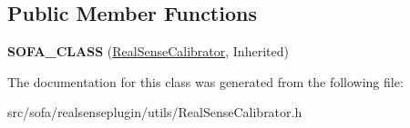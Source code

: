 \subsection*{Public Member Functions}
\begin{DoxyCompactItemize}
\item 
\mbox{\label{classsofa_1_1rgbdtracking_1_1_real_sense_calibrator_a65aec8ab1fa6f8bda1ed0b496d818522}} 
{\bfseries S\+O\+F\+A\+\_\+\+C\+L\+A\+SS} (\hyperlink{classsofa_1_1rgbdtracking_1_1_real_sense_calibrator}{Real\+Sense\+Calibrator}, Inherited)
\end{DoxyCompactItemize}


The documentation for this class was generated from the following file\+:\begin{DoxyCompactItemize}
\item 
src/sofa/realsenseplugin/utils/Real\+Sense\+Calibrator.\+h\end{DoxyCompactItemize}
